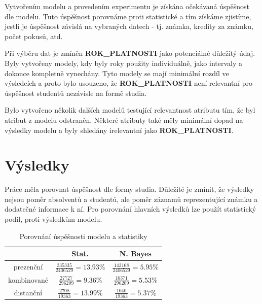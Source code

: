 \documentclass[12pt, letterpaper]{article}
\begin{document}
Vytvořením modelu a provedením experimentu je získána očekávaná úspěšnost dle modelu. Tuto úspěšnost porovnáme proti 
statistické a tím získáme zjistíme, jestli je úspěšnost závislá na vybraných datech - tj. známka, kredity za známku, 
počet pokusů, atd.

Při výběru dat je zmíněn \textbf{ROK\_PLATNOSTI} jako potenciálně důležitý údaj. Byly vytvořeny modely, kdy byly roky
použity individuálně, jako intervaly a dokonce kompletně vynechány. Tyto modely se mají minimální rozdíl ve výsledcích
a proto bylo usouzeno, že \textbf{ROK\_PLATNOSTI} není relevantní pro úspěšnost studentů nezávisle na formě studia.

Bylo vytvořeno několik dalších modelů testující relevantnost atributu tím, že byl atribut z modelu odstraněn. Některé 
atributy také měly minimální dopad na výsledky modelu a byly shledány irelevantní jako \textbf{ROK\_PLATNOSTI}.
\section{Výsledky}
Práce měla porovnat úspěšnost dle formy studia. Důležité je zmínit, že výsledky nejsou poměr absolventů a studentů, 
ale poměr záznamů reprezentující známku a dodatečné informace k ní. Pro porovnání hlavních výsledků lze použít 
statistický podíl, proti výsledkům modelu.
\begin{table}[H]
    \begin{center}
        \begin{tabular}{ | c || c | c | }
            \hline
                        & Stat.     & N. Bayes    \\
            \hline \hline
            prezenční   & $\frac{335335}{2406529} = 13.93\%$    & $\frac{143168}{2406529} = 5.95\%$ \\
            \hline
            kombinované & $\frac{27727}{296209} = 9.36\%$       & $\frac{16371}{296209} = 5.53\%$   \\
            \hline
            distanční   & $\frac{2708}{19363} = 13.99\%$        & $\frac{1040}{19363} = 5.37\%$     \\
            \hline
        \end{tabular}
        \caption{Porovnání úspěšnosti modelu a statistiky}
        \label{table:main_result}
    \end{center}
\end{table}
\end{document}
